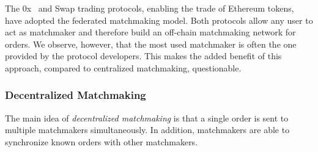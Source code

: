 


The 0x~\cite{0x} and Swap trading protocols, enabling the trade of Ethereum tokens, have adopted the federated matchmaking model.
Both protocols allow any user to act as matchmaker and therefore build an off-chain matchmaking network for orders.
We observe, however, that the most used matchmaker is often the one provided by the protocol developers.
This makes the added benefit of this approach, compared to centralized matchmaking, questionable.

\subsubsection{Decentralized Matchmaking}
The main idea of \emph{decentralized matchmaking} is that a single order is sent to multiple matchmakers simultaneously.
In addition, matchmakers are able to synchronize known orders with other matchmakers.

